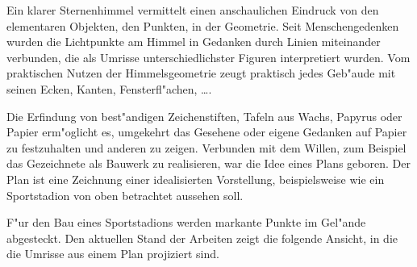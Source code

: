 \begin{MIntro}

Ein klarer Sternenhimmel vermittelt einen anschaulichen Eindruck von den 
elementaren Objekten, den Punkten, in der Geometrie. Seit Menschengedenken
wurden die Lichtpunkte am Himmel in Gedanken durch Linien miteinander 
verbunden, die als Umrisse unterschiedlichster Figuren interpretiert wurden.
Vom praktischen Nutzen der Himmelsgeometrie zeugt praktisch jedes Geb"aude
mit seinen Ecken, Kanten, Fensterfl"achen, \ldots.

Die Erfindung von best"andigen Zeichenstiften, Tafeln aus Wachs, Papyrus oder 
Papier erm"oglicht es, umgekehrt das Gesehene oder eigene Gedanken {\glqq}auf
Papier{\grqq} zu festzuhalten und anderen zu zeigen. Verbunden mit dem Willen,
zum Beispiel das Gezeichnete als Bauwerk zu realisieren, war die Idee eines
Plans geboren. Der Plan ist eine Zeichnung einer idealisierten Vorstellung, 
beispielsweise wie ein Sportstadion von oben betrachtet aussehen soll.

F"ur den Bau eines Sportstadions werden markante Punkte im Gel"ande abgesteckt.
Den aktuellen Stand der Arbeiten zeigt die folgende Ansicht, in die die Umrisse 
aus einem Plan projiziert sind.


\end{MIntro}
